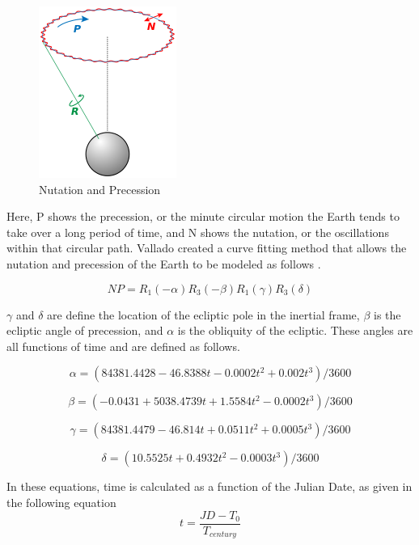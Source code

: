 \documentclass[12pt,a4paper]{book}
\begin{document}
\begin{figure}[h!]
\centering
\includegraphics[scale=0.5]{NP.png}
\caption{Nutation and Precession}
\label{f:nutpress} %
\end{figure}

Here, P shows the precession, or the minute circular motion the Earth tends to take over a long period of time, and N shows the nutation, or the oscillations within that circular path.  Vallado created a curve fitting method that allows the nutation and precession of the Earth to be modeled as follows \cite{b:vallado}.

\begin{equation}
NP = R_{1}(-\alpha)R_{3}(-\beta)R_{1}(\gamma)R_{3}(\delta)
\end{equation}

$\gamma$ and $\delta$ are define the location of the ecliptic pole in the inertial frame, $\beta$ is the ecliptic angle of precession, and $\alpha$ is the obliquity of the ecliptic.  These angles are all functions of time and are defined as follows.

\begin{equation}
\alpha = (84381.4428 - 46.8388t - 0.0002t^{2} + 0.002t^{3})/3600
\end{equation}

\begin{equation}
\beta = (-0.0431 + 5038.4739t + 1.5584t^{2} - 0.0002t^{3})/3600
\end{equation}

\begin{equation}
\gamma = (84381.4479 - 46.814t + 0.0511t^{2} + 0.0005t^{3})/3600
\end{equation}

\begin{equation}
\delta = (10.5525t + 0.4932t^{2} - 0.0003t^{3})/3600
\end{equation}

In these equations, time is calculated as a function of the Julian Date, as given in the following equation
\begin{equation}
t = \frac{JD-T_{0}}{T_{century}}
\end{equation}
\end{document}
